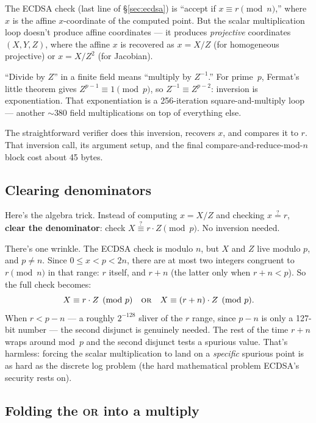 \documentclass[11pt,a4paper]{article}
\begin{document}
The ECDSA check (last line of \S\ref{sec:ecdsa}) is ``accept if
$x \equiv r \pmod n$,'' where $x$ is the affine $x$-coordinate of the
computed point. But the scalar multiplication loop doesn't produce
affine coordinates --- it produces \emph{projective} coordinates
$(X, Y, Z)$, where the affine $x$ is recovered as $x = X / Z$ (for
homogeneous projective) or $x = X / Z^2$ (for Jacobian).

``Divide by $Z$'' in a finite field means ``multiply by $Z^{-1}$.''
For prime~$p$, Fermat's little theorem gives $Z^{p-1} \equiv 1
\pmod p$, so $Z^{-1} \equiv Z^{p-2}$: inversion is exponentiation.
That exponentiation is a 256-iteration square-and-multiply loop ---
another $\sim$380 field multiplications on top of everything else.

The straightforward verifier does this inversion, recovers $x$, and
compares it to $r$. That inversion call, its argument setup, and the
final compare-and-reduce-mod-$n$ block cost about 45 bytes.

\subsection{Clearing denominators}

Here's the algebra trick. Instead of computing $x = X/Z$ and checking
$x \stackrel{?}{=} r$, \textbf{clear the denominator}: check
$X \stackrel{?}{\equiv} r \cdot Z \pmod p$. No inversion needed.

There's one wrinkle. The ECDSA check is modulo $n$, but $X$ and $Z$
live modulo $p$, and $p \neq n$. Since $0 \le x < p < 2n$, there are
at most two integers congruent to $r \pmod n$ in that range: $r$
itself, and $r + n$ (the latter only when $r + n < p$). So the full
check becomes:
\[
  X \equiv r \cdot Z \pmod p
  \quad\textsc{or}\quad
  X \equiv (r+n) \cdot Z \pmod p.
\]
When $r < p - n$ --- a roughly $2^{-128}$ sliver of the $r$ range,
since $p - n$ is only a 127-bit number --- the second disjunct is
genuinely needed. The rest of the time $r + n$ wraps around mod~$p$
and the second disjunct tests a spurious value. That's harmless:
forcing the scalar multiplication to land on a \emph{specific}
spurious point is as hard as the discrete log problem (the hard
mathematical problem ECDSA's security rests on).

\subsection{Folding the \textsc{or} into a multiply}
\end{document}
